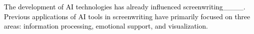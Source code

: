 \textcolor{black}{The development of AI technologies has already influenced screenwriting____. Previous applications of AI tools in screenwriting have primarily focused on three areas: information processing, emotional support, and visualization.}



